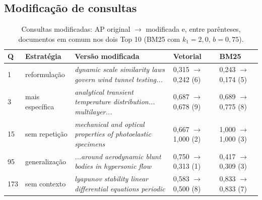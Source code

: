 \documentclass[10pt,a4paper]{article}
\newcommand{\term}[1]{\textit{#1}}      %
\begin{document}
\subsection{Modificação de consultas}

\begin{table}[!htb]
  \centering\small
  \caption{Consultas modificadas: AP original $\to$ modificada e, entre parênteses, documentos em comum nos dois Top 10 (BM25 com $k_1=2{,}0$, $b=0{,}75$).}
  \label{tab:mod}
  \begin{tabular}{lllll}
    \toprule
    Q & Estratégia & Versão modificada & Vetorial & BM25\\
    \midrule
    1   & reformulação   & \term{dynamic scale similarity laws govern wind tunnel testing...} & 0,315 $\to$ 0,242 (6) & 0,243 $\to$ 0,174 (5)\\
    3   & mais específica & \term{analytical transient temperature distribution... multilayer...} & 0,687 $\to$ 0,678 (9) & 0,689 $\to$ 0,775 (8)\\
    15  & sem repetição  & \term{mechanical and optical properties of photoelastic specimens} & 0,667 $\to$ 1,000 (2) & 1,000 $\to$ 1,000 (3)\\
    95  & generalização  & \term{...around aerodynamic blunt bodies in hypersonic flow} & 0,750 $\to$ 0,313 (1) & 0,417 $\to$ 0,309 (3)\\
    173 & sem contexto   & \term{lyapunov stability linear differential equations periodic} & 0,583 $\to$ 0,500 (8) & 0,833 $\to$ 0,833 (7)\\
    \bottomrule
  \end{tabular}
\end{table}
\end{document}
